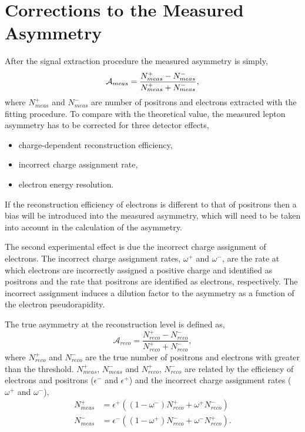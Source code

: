 \section{Corrections to the Measured Asymmetry}
\label{sec:corrections1}
After the signal extraction procedure the measured asymmetry is simply,
\begin{equation}
\mathcal{A}_{meas} = \frac{
\label{eq:meas}
  N_{meas}^{+} -
  N_{meas}^{-}
}
{
  N_{meas}^{+} +
  N_{meas}^{-}
},
\end{equation}
where $N_{meas}^{+}$ and $N_{meas}^{-}$ are number of positrons and
electrons extracted with the fitting procedure.
To compare with the theoretical value, the measured lepton asymmetry has to be
corrected for three detector effects,
\begin{itemize}
\item charge-dependent reconstruction efficiency,
\item incorrect charge assignment rate,
\item electron energy resolution.
\end{itemize}

If the reconstruction efficiency of electrons is different to that of positrons
then a bias will be introduced into the measured asymmetry, which will need to
be taken into account in the calculation of the asymmetry.  

The second experimental effect is due the incorrect charge assignment of electrons.
The incorrect charge assignment rates, $\omega^+$ and $\omega^-$, are the rate
at which electrons are incorrectly assigned a positive charge and identified as
positrons and the rate that positrons are identified as electrons, respectively.  The
incorrect assignment induces a dilution factor to the asymmetry as a function of
the electron pseudorapidity. 

The true asymmetry at the reconstruction level is defined as,
\begin{equation}
\label{eq:reco}
\mathcal{A}_{reco} = \frac{
  N_{reco}^{+} -
  N_{reco}^{-}
}
{
  N_{reco}^{+} +
  N_{reco}^{-}
},
\end{equation}
where $N_{reco}^{+}$ and $N_{reco}^{-}$ are the true number of positrons and
electrons with \pT greater than the threshold.  $N_{meas}^{+}$, $N_{meas}^{-}$
and $N_{reco}^{+}$, $N_{reco}^{-}$ are related by the efficiency of electrons
and positrons ($\epsilon^{-}$ and $\epsilon^{+}$) and the incorrect charge
assignment rates ($\omega^{+}$ and $\omega^{-}$),
\begin{align}
  \label{eq:poscor}
  N_{meas}^{+} 
  &= \epsilon^+ \left( ( 1 - \omega^- ) N_{reco}^{+} + \omega^+ N_{reco}^{-} \right)\\
  \label{eq:negcor}
  N_{meas}^{-} 
  &= \epsilon^- \left( ( 1 - \omega^+ ) N_{reco}^{-} + \omega^- N_{reco}^{+} \right).
\end{align}


